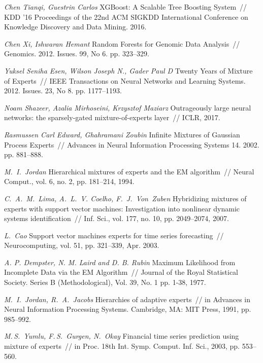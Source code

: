 \documentclass[12pt, twoside]{article}
\numberwithin{equation}{section}
\begin{document}
\begin{thebibliography}{99}
	\textit{Chen Tianqi, Guestrin Carlos} XGBoost: A Scalable Tree Boosting System~// KDD ’16 Proceedings of the 22nd ACM SIGKDD International Conference on Knowledge Discovery and Data Mining. 2016.
	
	\textit{Chen Xi, Ishwaran Hemant} Random Forests for Genomic Data Analysis~// Genomics. 2012. Issues. 99, No 6. pp. 323--329.

	\textit{Yuksel Seniha Esen, Wilson Joseph N., Gader Paul D} Twenty Years of Mixture of Experts~// IEEE Transactions on Neural Networks and Learning Systems. 2012. Issues. 23, No 8. pp. 1177–1193.

	\textit{Noam Shazeer, Azalia Mirhoseini, Krzysztof Maziarz} Outrageously large neural networks: the sparsely-gated mixture-of-experts layer~// ICLR, 2017.

	\textit{Rasmussen Carl Edward, Ghahramani Zoubin} Infinite Mixtures of Gaussian Process Experts~// Advances in Neural Information Processing Systems 14. 2002. pp. 881–888.
	
	\textit{M.~I.~Jordan} Hierarchical mixtures of experts and the EM algorithm~// Neural Comput., vol. 6, no. 2, pp. 181–214, 1994.
	
	\textit{C.~A.~M.~Lima, A.~L.~V. Coelho, F.~J.~Von~Zuben} Hybridizing mixtures of experts with support vector machines: Investigation into nonlinear dynamic systems identification~// Inf. Sci., vol. 177, no. 10, pp. 2049–2074, 2007.

	\textit{L.~Cao} Support vector machines experts for time series forecasting~// Neurocomputing, vol. 51, pp. 321–339, Apr. 2003.

	\textit{A. P. Dempster, N. M. Laird and D. B. Rubin} Maximum Likelihood from Incomplete Data via the EM Algorithm~// Journal of the Royal Statistical Society. Series B (Methodological), Vol. 39, No. 1 pp. 1-38, 1977.
	
	\textit{M.~I.~Jordan, R.~A.~Jacobs} Hierarchies of adaptive experts~// in Advances in Neural Information Processing Systems. Cambridge, MA: MIT Press, 1991, pp. 985–992.
	
	\textit{M.\,S.~Yumlu, F.\,S.~Gurgen,  N.~Okay} Financial time series prediction using mixture of experts~// in Proc. 18th Int. Symp. Comput. Inf. Sci., 2003, pp. 553--560.
	

\end{thebibliography}
\end{document}
